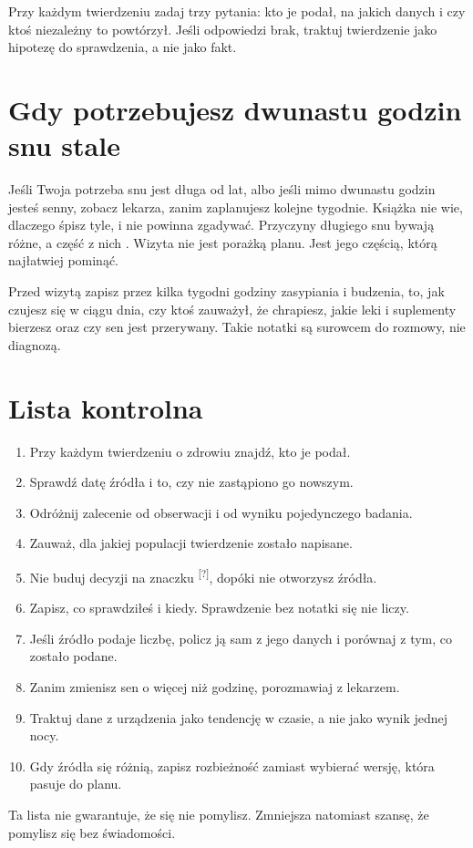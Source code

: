 Przy każdym twierdzeniu zadaj trzy pytania: kto je podał, na jakich danych i czy ktoś niezależny to powtórzył. Jeśli odpowiedzi brak, traktuj twierdzenie jako hipotezę do sprawdzenia, a nie jako fakt.

\section{Gdy potrzebujesz dwunastu godzin snu stale}

Jeśli Twoja potrzeba snu jest długa od lat, albo jeśli mimo dwunastu godzin jesteś senny, zobacz lekarza, zanim zaplanujesz kolejne tygodnie. Książka nie wie, dlaczego śpisz tyle, i nie powinna zgadywać. Przyczyny długiego snu bywają różne, a część z nich . Wizyta nie jest porażką planu. Jest jego częścią, którą najłatwiej pominąć.

Przed wizytą zapisz przez kilka tygodni godziny zasypiania i budzenia, to, jak czujesz się w ciągu dnia, czy ktoś zauważył, że chrapiesz, jakie leki i suplementy bierzesz oraz czy sen jest przerywany. Takie notatki są surowcem do rozmowy, nie diagnozą.

\section{Lista kontrolna}

\begin{enumerate}
\item Przy każdym twierdzeniu o zdrowiu znajdź, kto je podał.
\item Sprawdź datę źródła i to, czy nie zastąpiono go nowszym.
\item Odróżnij zalecenie od obserwacji i od wyniku pojedynczego badania.
\item Zauważ, dla jakiej populacji twierdzenie zostało napisane.
\item Nie buduj decyzji na znaczku \textsuperscript{[?]}, dopóki nie otworzysz źródła.
\item Zapisz, co sprawdziłeś i kiedy. Sprawdzenie bez notatki się nie liczy.
\item Jeśli źródło podaje liczbę, policz ją sam z jego danych i porównaj z tym, co zostało podane.
\item Zanim zmienisz sen o więcej niż godzinę, porozmawiaj z lekarzem.
\item Traktuj dane z urządzenia jako tendencję w czasie, a nie jako wynik jednej nocy.
\item Gdy źródła się różnią, zapisz rozbieżność zamiast wybierać wersję, która pasuje do planu.
\end{enumerate}

Ta lista nie gwarantuje, że się nie pomylisz. Zmniejsza natomiast szansę, że pomylisz się bez świadomości.
